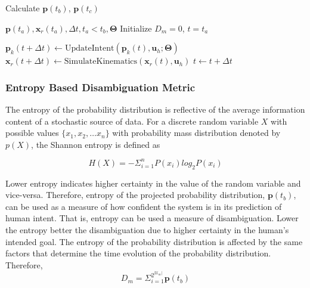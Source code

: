 \documentclass[conference]{IEEEtran}
\begin{document}
\begin{algorithm}[t]
	\caption{Calculate $\boldsymbol{p}(t_b)$, $\boldsymbol{p}(t_c)$}
	\label{alg1}
	\begin{algorithmic}[1]
		\REQUIRE $\boldsymbol{p}(t_a), \boldsymbol{x}_r(t_a), \Delta t, t_a < t_b, \boldsymbol{\Theta}$
		\STATE Initialize $D_m = 0$, $t = t_a$
		
		\STATE $\boldsymbol{p}_k(t + \Delta t) \leftarrow \text{UpdateIntent}(\boldsymbol{p}_k(t), \boldsymbol{u}_h; \boldsymbol{\Theta})$
		\STATE $\boldsymbol{x}_r(t + \Delta t) \leftarrow \text{SimulateKinematics}(\boldsymbol{x}_r(t), \boldsymbol{u}_h)$
		  
		\ENDIF
		\STATE $t \leftarrow t + \Delta t$
		\ENDWHILE
		
		\ENDFOR
		
	\end{algorithmic}
\end{algorithm}

\subsubsection{Entropy Based Disambiguation Metric}
The entropy of the probability distribution is reflective of the average information content of a stochastic source of data. For a discrete random variable $X$ with possible values $\{x_1, x_2,\dots x_n\}$ with probability mass distribution denoted by $p(X)$, the Shannon entropy is defined as 

\begin{equation*}
H(X) = -\Sigma_{i = 1}^{n} P(x_i)log_{2}P(x_i)
\end{equation*}

Lower entropy indicates higher certainty in the value of the random variable and vice-versa. Therefore, entropy of the projected probability distribution, $\boldsymbol{p}(t_b)$, can be used as a measure of how confident the system is in its prediction of human intent. That is, entropy can be used a measure of disambiguation. Lower the entropy better the disambiguation due to higher certainty in the human's intended goal. The entropy of the probability distribution is affected by the same factors that determine the time evolution of the probability distribution. 
Therefore, 
\begin{equation}
D_m = \Sigma_{i=1}^{2^{\vert\mathcal{U}_{m}\vert}} \boldsymbol{p}(t_b)
\end{equation}
\end{document}
